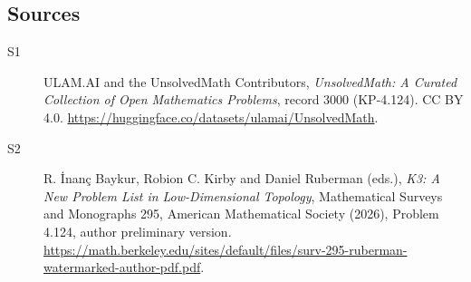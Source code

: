 \documentclass[11pt]{article}
\begin{document}
\subsection{Sources}
\begin{description}
\item[\hypertarget{source:3000:1}{S1}] ULAM.AI and the UnsolvedMath Contributors, \emph{UnsolvedMath: A Curated Collection of Open Mathematics Problems}, record 3000 (KP-4.124). CC BY 4.0. \url{https://huggingface.co/datasets/ulamai/UnsolvedMath}.
\item[\hypertarget{source:3000:2}{S2}] R. İnanç Baykur, Robion C. Kirby and Daniel Ruberman (eds.), \emph{K3: A New Problem List in Low-Dimensional Topology}, Mathematical Surveys and Monographs 295, American Mathematical Society (2026), Problem 4.124, author preliminary version. \url{https://math.berkeley.edu/sites/default/files/surv-295-ruberman-watermarked-author-pdf.pdf}.
\end{description}
\label{end:3000}
\end{document}
